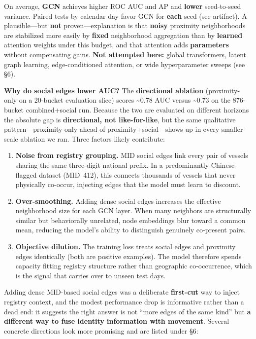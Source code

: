 \documentclass[
]{article}
\providecommand{\tightlist}{%
  \setlength{\itemsep}{0pt}\setlength{\parskip}{0pt}}
\begin{document}
On average, \textbf{GCN} achieves higher ROC AUC and AP and
\textbf{lower} seed-to-seed variance. Paired tests by calendar day favor
GCN for \textbf{each} seed (see artifact). A plausible---but
\textbf{not} proven---explanation is that \textbf{noisy} proximity
neighborhoods are stabilized more easily by \textbf{fixed} neighborhood
aggregation than by \textbf{learned} attention weights under this
budget, and that attention adds \textbf{parameters} without compensating
gains. \textbf{Not attempted here:} global transformers, latent graph
learning, edge-conditioned attention, or wide hyperparameter sweeps (see
§6).

\textbf{Why do social edges lower AUC?} The \textbf{directional
ablation} (proximity-only on a 20-bucket evaluation slice) scores
\textasciitilde0.78 AUC versus \textasciitilde0.73 on the 876-bucket
combined+social run. Because the two are evaluated on different horizons
the absolute gap is \textbf{directional, not like-for-like}, but the
same qualitative pattern---proximity-only ahead of
proximity+social---shows up in every smaller-scale ablation we ran.
Three factors likely contribute:

\begin{enumerate}
\def\labelenumi{\arabic{enumi}.}
\tightlist
\item
  \textbf{Noise from registry grouping.} MID social edges link every
  pair of vessels sharing the same three-digit national prefix. In a
  predominantly Chinese-flagged dataset (MID~412), this connects
  thousands of vessels that never physically co-occur, injecting edges
  that the model must learn to discount.
\item
  \textbf{Over-smoothing.} Adding dense social edges increases the
  effective neighborhood size for each GCN layer. When many neighbors
  are structurally similar but behaviorally unrelated, node embeddings
  blur toward a common mean, reducing the model's ability to distinguish
  genuinely co-present pairs.
\item
  \textbf{Objective dilution.} The training loss treats social edges and
  proximity edges identically (both are positive examples). The model
  therefore spends capacity fitting registry structure rather than
  geographic co-occurrence, which is the signal that carries over to
  unseen test days.
\end{enumerate}

Adding dense MID-based social edges was a deliberate \textbf{first-cut}
way to inject registry context, and the modest performance drop is
informative rather than a dead end: it suggests the right answer is not
``more edges of the same kind'' but \textbf{a different way to fuse
identity information with movement}. Several concrete directions look
more promising and are listed under §6:
\end{document}
